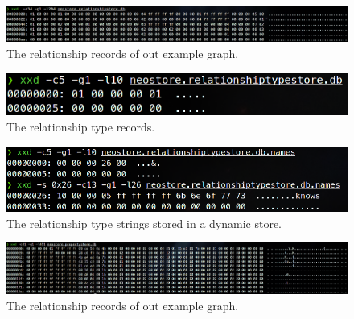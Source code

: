 \documentclass[a4paper,10pt]{article}
\begin{document}
    \begin{figure}[htp]\label{relationships}
        \begin{center}
            \includegraphics[keepaspectratio,height=1.2\textheight,width=1.2\textwidth]{img/04_example/relationships.png}
        \end{center}
        \caption{The relationship records of out example graph.} %
    \end{figure}
    \begin{figure}[htp]\label{relation_type_token}
        \begin{center}
            \includegraphics[keepaspectratio,height=1.2\textheight,width=1.2\textwidth]{img/04_example/relationshiptype_token.png}
        \end{center}
        \caption{The relationship type records.} %
    \end{figure}
    \begin{figure}[htp]\label{relationship_type_string}
        \begin{center}
            \includegraphics[keepaspectratio,height=1.2\textheight,width=1.2\textwidth]{img/04_example/relationshiptype_string_dynamic.png}
        \end{center}
        \caption{The relationship type strings stored in a dynamic store.} %
    \end{figure}
    \begin{figure}[htp]\label{properties}
        \begin{center}
            \includegraphics[keepaspectratio,height=1.2\textheight,width=1.2\textwidth]{img/04_example/properties.png}
        \end{center}
        \caption{The relationship records of out example graph.} %
    \end{figure}
\end{document}
